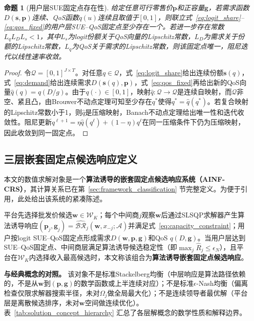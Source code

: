 \documentclass[UTF8,11pt]{ctexart}
\newtheorem{proposition}{命题}
\newcommand{\qos}{q}
\newcommand{\D}{D}
\newcommand{\w}{\boldsymbol{w}}
\newcommand{\p}{\boldsymbol{p}}
\newcommand{\g}{\boldsymbol{g}}
\begin{document}
\begin{proposition}[用户层SUE固定点存在性]
\label{prop:sue_fixed_point}
给定任意可行零售价$\p$和正容量$\g$，若需求函数$\D(\boldsymbol{s},\p)$连续、QoS函数$\qos(u)$连续且取值于$[0,1]$，则联立式~\eqref{eq:logit_share}--\eqref{eq:qos_fixed}的用户层SUE--QoS固定点至少存在一个。若进一步存在常数$L_\qos L_D L_s<1$，其中$L_s$为logit份额关于QoS向量的Lipschitz常数，$L_D$为需求关于份额的Lipschitz常数，$L_\qos$为QoS关于需求的Lipschitz常数，则该固定点唯一，阻尼迭代以线性速率收敛。
\end{proposition}

\begin{proof}
令$\mathcal{Q}=[0,1]^{J\times T}$。对任意$q\in\mathcal{Q}$，式~\eqref{eq:logit_share}给出连续份额$\boldsymbol{s}(q)$，式~\eqref{eq:demand}给出连续需求$\D(\boldsymbol{s}(q),\p)$，式~\eqref{eq:qos_fixed}再给出新的QoS向量$\widehat q(q)=\qos(\D/g)$。由于$\qos(\cdot)\in[0,1]$，映射$\widehat q:\mathcal{Q}\to\mathcal{Q}$是连续自映射，而$\mathcal{Q}$非空、紧且凸，由Brouwer不动点定理可知至少存在$q^*$使得$q^*=\widehat q(q^*)$。若复合映射的Lipschitz常数小于1，则$\widehat q$是压缩映射，Banach不动点定理给出唯一性和迭代收敛性。阻尼更新$q^{\ell+1}=\eta\widehat q(q^\ell)+(1-\eta)q^\ell$在同一压缩条件下仍为压缩映射，因此收敛到同一固定点。
\end{proof}

\subsection{三层嵌套固定点候选响应定义}
\label{sec:three_level_game}

本文的数值求解对象是一个\textbf{算法诱导的嵌套固定点候选响应系统（AINF-CRS）}，其计算关系已在第~\ref{sec:framework_classification} 节完整定义。为便于引用，此处给出该系统的紧凑陈述。

平台先选择批发价候选$\w\in\mathcal{W}_K$；每个中间商$j$观察$\w$后通过SLSQP求解器产生算法诱导响应$(\p_j,\g_j)=\widehat{\mathcal{BR}}_j(\w,x_{-j};\mathcal{A})$并满足式~\eqref{eq:capacity_constraint}；用户按logit SUE--QoS固定点形成需求$\D(\w,\p,\g)$和QoS $q(\D,\g)$。当用户层达到SUE--QoS固定点、中间商层满足算法诱导候选稳定性（即$\max_j\widehat R_j\le\epsilon_N$），且平台在$\mathcal{W}_K$内选择收入最高候选时，本文称该组合为\textbf{算法诱导嵌套固定点候选响应}。

\textbf{与经典概念的对照。} 该对象不是标准Stackelberg均衡（中层响应是算法路径依赖的，不是从$\w$到$(\p,\g)$的数学函数或上半连续对应）；不是标准$\epsilon$-Nash均衡（偏离检查仅限求解器搜索半径，未对$\Omega_j$做全局最大化）；不是连续领导者最优解（平台层是离散候选排序，未对$\w$空间做连续优化）。表~\ref{tab:solution_concept_hierarchy} 汇总了各层解概念的数学性质和解释边界。
\end{document}
